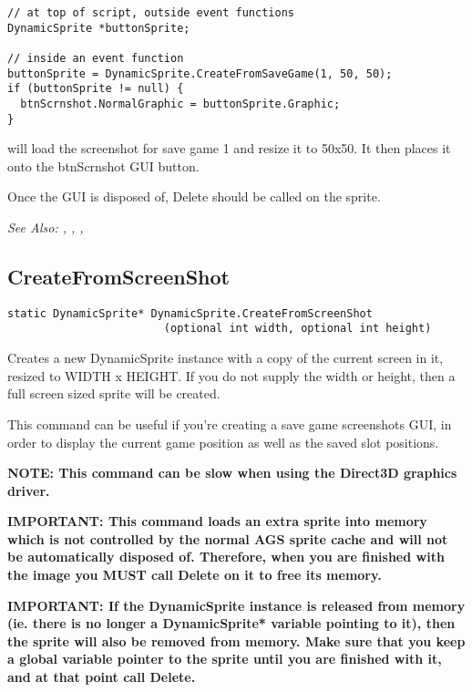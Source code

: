 \begin{verbatim}
// at top of script, outside event functions
DynamicSprite *buttonSprite;

// inside an event function
buttonSprite = DynamicSprite.CreateFromSaveGame(1, 50, 50);
if (buttonSprite != null) {
  btnScrnshot.NormalGraphic = buttonSprite.Graphic;
}
\end{verbatim}
will load the screenshot for save game 1 and resize it to 50x50. It then places it onto
the btnScrnshot GUI button.

Once the GUI is disposed of, Delete should be called on the sprite.

\it{See Also:} ,
,
,


\subsection{CreateFromScreenShot}\label{DynamicSprite.CreateFromScreenShot}%

\begin{verbatim}
static DynamicSprite* DynamicSprite.CreateFromScreenShot
                        (optional int width, optional int height)
\end{verbatim}
Creates a new DynamicSprite instance with a copy of the current screen in it,
resized to WIDTH x HEIGHT. If you do not supply the width or height, then a full screen
sized sprite will be created.

This command can be useful if you're creating a save game screenshots GUI, in order to
display the current game position as well as the saved slot positions.

\bf{NOTE:} This command can be slow when using the Direct3D graphics driver.

\bf{IMPORTANT:} This command loads an extra sprite into memory which is not controlled
by the normal AGS sprite cache and will not be automatically disposed of. Therefore, when
you are finished with the image you \bf{MUST} call Delete on it to free its memory.

\bf{IMPORTANT:} If the DynamicSprite instance is released from memory (ie. there is
no longer a DynamicSprite* variable pointing to it), then the sprite will also be
removed from memory. Make sure that you keep a global variable pointer to the sprite
until you are finished with it, and at that point call Delete.

